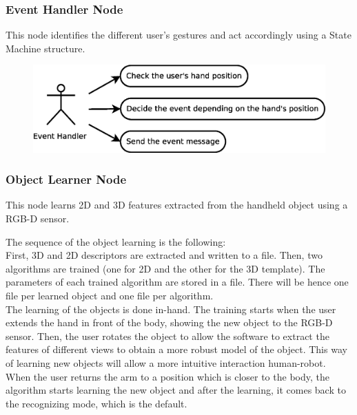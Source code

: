 \documentclass{article}
\begin{document}


\subsubsection{Event Handler Node}
	This node identifies the different user's gestures and act accordingly using a State Machine structure. 
	\begin{figure}[H]
\begin{center}
		\includegraphics[scale=0.4]{../../img/diagrams/uc_event_handler.eps}
	\end{center}
\end{figure}
	
	
\subsubsection{Object Learner Node}

\hspace{0.5cm}This node learns 2D and 3D features extracted from the handheld object using a RGB-D sensor.   

The sequence of the object learning is the following:
\\
First, 3D and 2D descriptors are extracted and written to a file. Then, two algorithms are trained (one for 2D and the other for the 3D template). The parameters of each trained algorithm are stored in a file. There will be hence one file per learned object and one file per algorithm.
\\

The learning of the objects is done in-hand. The training starts when the user extends the hand in front of the body, showing the new object to the RGB-D sensor. Then, the user rotates the object to allow the software to extract the features of different views to obtain a more robust model of the object. This way of learning new objects will allow a more intuitive interaction human-robot. When the user returns the arm to a position which is closer to the body, the algorithm starts learning the new object and after the learning, it comes back to the recognizing mode, which is the default. 
\end{document}

